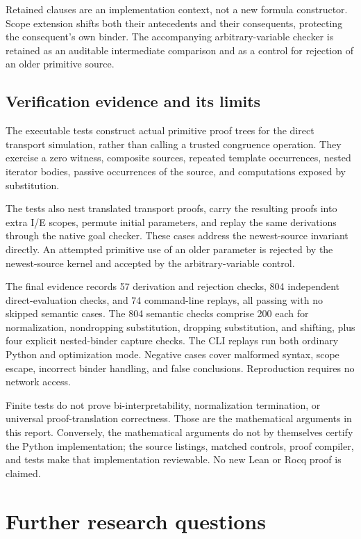 \documentclass[11pt]{article}
\theoremstyle{definition}
\theoremstyle{remark}
\begin{document}
Retained clauses are an implementation context, not a new formula
constructor. Scope extension shifts both their antecedents and their
consequents, protecting the consequent's own binder. The accompanying
arbitrary-variable checker is retained as an auditable intermediate
comparison and as a control for rejection of an older primitive source.

\subsection{Verification evidence and its limits}

The executable tests construct actual primitive proof trees for the
direct transport simulation, rather than calling a trusted congruence
operation. They exercise a zero witness, composite sources, repeated
template occurrences, nested iterator bodies, passive occurrences of
the source, and computations exposed by substitution.

The tests also nest translated transport proofs, carry the resulting
proofs into extra I/E scopes, permute initial parameters, and replay the
same derivations through the native goal checker. These cases address
the newest-source invariant directly. An attempted primitive use of an
older parameter is rejected by the newest-source kernel and accepted
by the arbitrary-variable control.

The final evidence records 57 derivation and rejection checks, 804
independent direct-evaluation checks, and 74 command-line replays, all
passing with no skipped semantic cases. The 804 semantic checks comprise
200 each for normalization, nondropping substitution, dropping substitution,
and shifting, plus four explicit nested-binder capture checks. The CLI
replays run both ordinary Python and optimization mode. Negative cases
cover malformed syntax, scope escape, incorrect binder handling, and false
conclusions. Reproduction requires no network access.

Finite tests do not prove bi-interpretability, normalization termination,
or universal proof-translation correctness. Those are the mathematical
arguments in this report. Conversely, the mathematical arguments do not
by themselves certify the Python implementation; the source listings,
matched controls, proof compiler, and tests make that implementation
reviewable. No new Lean or Rocq proof is claimed.

\section{Further research questions}
\end{document}
